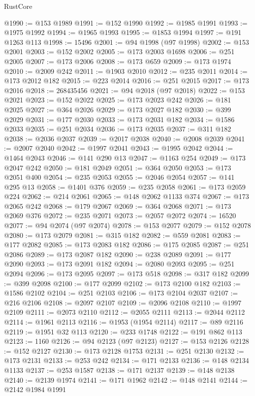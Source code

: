 \begin{lexlean}{RustCore}
\begin{coremodule}
@1990 := @153 @1989
@1991 := @152 @1990
@1992 := @1985 @1991
@1993 := @1975 @1992
@1994 := @1965 @1993
@1995 := @1853 @1994
@1997 := @191 @1263 @113
@1998 := 15496
@2001 := @94 @1998 (@97 @1998)
@2002 := @153 @2001
@2003 := @152 @2002
@2005 := @173 @2003 @1698
@2006 := @251 @2005
@2007 := @173 @2006
@2008 := @173 @659
@2009 := @173 @1974
@2010 := @2009 @242
@2011 := @1903 @2010
@2012 := @235 @2011
@2014 := @173 @2012 @182
@2015 := @223 @2014
@2016 := @251 @2015
@2017 := @173 @2016
@2018 := 268435456
@2021 := @94 @2018 (@97 @2018)
@2022 := @153 @2021
@2023 := @152 @2022
@2025 := @173 @2023 @242
@2026 := @181 @2025
@2027 := @364 @2026
@2029 := @173 @2027 @182
@2030 := @399 @2029
@2031 := @177 @2030
@2033 := @173 @2031 @182
@2034 := @1586 @2033
@2035 := @251 @2034
@2036 := @173 @2035
@2037 := @311 @182
@2038 := @2036 @2037
@2039 := @2017 @2038
@2040 := @2008 @2039
@2041 := @2007 @2040
@2042 := @1997 @2041
@2043 := @1995 @2042
@2044 := @1464 @2043
@2046 := @141 @290 @13
@2047 := @1163 @254
@2049 := @173 @2047 @242
@2050 := @181 @2049
@2051 := @364 @2050
@2053 := @173 @2051 @400
@2054 := @235 @2053
@2055 := @2046 @2054
@2057 := @141 @295 @13
@2058 := @1401 @376
@2059 := @235 @2058
@2061 := @173 @2059 @224
@2062 := @214 @2061
@2065 := @148 @2062 @1133 @374
@2067 := @173 @2065 @242
@2068 := @179 @2067
@2069 := @364 @2068
@2071 := @173 @2069 @376
@2072 := @235 @2071
@2073 := @2057 @2072
@2074 := 16520
@2077 := @94 @2074 (@97 @2074)
@2078 := @153 @2077
@2079 := @152 @2078
@2080 := @173 @2079
@2081 := @315 @182
@2082 := @559 @2081
@2083 := @177 @2082
@2085 := @173 @2083 @182
@2086 := @175 @2085
@2087 := @251 @2086
@2089 := @173 @2087 @182
@2090 := @238 @2089
@2091 := @177 @2090
@2093 := @173 @2091 @182
@2094 := @2080 @2093
@2095 := @251 @2094
@2096 := @173 @2095
@2097 := @173 @518
@2098 := @317 @182
@2099 := @399 @2098
@2100 := @177 @2099
@2102 := @173 @2100 @182
@2103 := @1586 @2102
@2104 := @251 @2103
@2106 := @173 @2104 @2037
@2107 := @216 @2106
@2108 := @2097 @2107
@2109 := @2096 @2108
@2110 := @1997 @2109
@2111 := @2073 @2110
@2112 := @2055 @2111
@2113 := @2044 @2112
@2114 := @1961 @2113
@2116 := @1953 (@1954 @2114)
@2117 := @89 @2116
@2119 := @1951 @32 @113
@2120 := @233 @1748
@2122 := @191 @862 @113
@2123 := 1160
@2126 := @94 @2123 (@97 @2123)
@2127 := @153 @2126
@2128 := @152 @2127
@2130 := @173 @2128 @1753
@2131 := @251 @2130
@2132 := @173 @2131
@2133 := @253 @242
@2134 := @171 @2133
@2136 := @148 @2134 @1133
@2137 := @253 @1587
@2138 := @171 @2137
@2139 := @148 @2138
@2140 := @2139 @1974
@2141 := @171 @1962
@2142 := @148 @2141
@2144 := @2142 @1984 @1991

\end{coremodule}
\end{lexlean}
